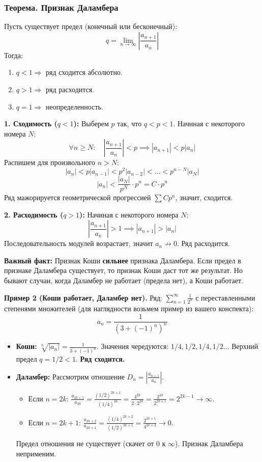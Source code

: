 \subsubsection*{Теорема. Признак Даламбера}
Пусть существует предел (конечный или бесконечный):
\[ q = \lim_{n\to\infty} \left| \frac{a_{n+1}}{a_n} \right| \]
Тогда:
\begin{enumerate}
    \item $q < 1 \Rightarrow$ ряд сходится абсолютно.
    \item $q > 1 \Rightarrow$ ряд расходится.
    \item $q = 1 \Rightarrow$ неопределенность.
\end{enumerate}

\begin{tcolorbox}[title=Доказательство]
    \textbf{1. Сходимость ($q < 1$):}
    Выберем $p$ так, что $q < p < 1$.
    Начиная с некоторого номера $N$:
    \[ \forall n \ge N: \quad \left| \frac{a_{n+1}}{a_n} \right| < p \implies |a_{n+1}| < p |a_n| \]
    Распишем для произвольного $n > N$:
    \[ |a_n| < p |a_{n-1}| < p^2 |a_{n-2}| < \dots < p^{n-N} |a_N| \]
    \[ |a_n| < \frac{|a_N|}{p^N} \cdot p^n = C \cdot p^n \]
    Ряд мажорируется геометрической прогрессией $\sum C p^n$, значит, сходится.

    \textbf{2. Расходимость ($q > 1$):}
    Начиная с некоторого номера $N$:
    \[ \left| \frac{a_{n+1}}{a_n} \right| > 1 \implies |a_{n+1}| > |a_n| \]
    Последовательность модулей возрастает, значит $a_n \not\to 0$. Ряд расходится.
\end{tcolorbox}

\textbf{Важный факт:} Признак Коши \textbf{сильнее} признака Даламбера.
Если предел в признаке Даламбера существует, то признак Коши даст тот же результат. Но бывают случаи, когда Даламбер не работает (предела нет), а Коши работает.

\textbf{Пример 2 (Коши работает, Даламбер нет).}
Ряд: $\sum_{n=1}^{\infty} \frac{1}{2^n}$ с переставленными степенями множителей (для наглядности возьмем пример из вашего конспекта):
\[ a_n = \frac{1}{(3+(-1)^n)^n} \]
\begin{itemize}
    \item \textbf{Коши:}
    $\sqrt[n]{|a_n|} = \frac{1}{3+(-1)^n}$. Значения чередуются: $1/4, 1/2, 1/4, 1/2 \dots$
    Верхний предел $q = 1/2 < 1$. \textbf{Ряд сходится.}
    
    \item \textbf{Даламбер:}
    Рассмотрим отношение $D_n = \left| \frac{a_{n+1}}{a_n} \right|$.
    \begin{itemize}
        \item Если $n=2k$: $\frac{a_{2k+1}}{a_{2k}} = \frac{(1/2)^{2k+1}}{(1/4)^{2k}} = \frac{4^{2k}}{2 \cdot 2^{2k}} = \frac{2^{4k}}{2^{2k+1}} = 2^{2k-1} \to \infty$.
        \item Если $n=2k+1$: $\frac{a_{2k+2}}{a_{2k+1}} = \frac{(1/4)^{2k+2}}{(1/2)^{2k+1}} = \frac{2^{2k+1}}{4^{2k+2}} \to 0$.
    \end{itemize}
    Предел отношения не существует (скачет от 0 к $\infty$). Признак Даламбера неприменим.
\end{itemize}

